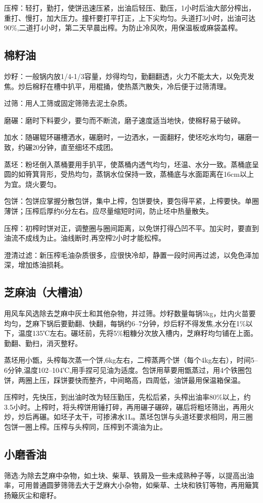 \documentclass{ctexbook}
\begin{document}
压榨：轻打，勤打，使饼迅速压紧，出油后轻压、勤压，1小时后油大部分榨出，重打、慢打，加大压力。撞杆要打平打正，上下尖均匀。头道打3小时，出油可达90\%,二道打4小时，第二天早晨出榨。为防止冷风吹，用保温板或麻袋盖榨。

\subsection{棉籽油}
炒籽：一般锅内放1/4-1/3容量，炒得均匀，勤翻翻透，火力不能太大，以免壳发焦。炒后棉籽在槽中扒平，用棍捅，使热蒸汽散失，冷后便于过筛清理。

过筛：用人工筛或固定筛筛去泥土杂质。

磨碾：磨时下料要少，要匀而不断流，磨子速度适当地快，使棉籽易于破碎。

加水：随碾辊环碾槽洒水，碾磨时，一边洒水，一面翻籽，使坯吃水均匀，碾磨一致，约碾20分钟，直至细坯不成团。

蒸坯：粉坯倒入蒸桶要用手扒平，使蒸桶内透气均匀，坯温、水分一致。蒸桶底呈圆的如筲箕背形，受热均匀，蒸锅水位保持一致，蒸桶底与水面距离在16cm以上为宜。烧火要匀。

包饼：包饼应掌握分散包饼，集中上榨，包饼要快，要包得平紧，上榨要快。单圈薄饼；压榨后厚约6分左右。应尽量缩短时间，防止坯中热量散失。

压榨：初榨时饼对正，调整圈与圈间距离，以免饼打得凸凹不平。加尖时，要直到油流不成线为止。油线断时,再空榨2小时才能松榨。

澄清过滤：新压榨毛油杂质很多，应很快冷却，静置一段时间再过滤，以免色泽加深，增加炼油损耗。
\subsection{芝麻油（大槽油）}
用风车风选除去芝麻中灰土和其他杂物，并过筛。炒籽数量每锅5kg，灶内火苗要均匀，芝麻下锅后要勤翻、快翻，每锅约6--7分钟，炒后籽不得发焦,水分在1\%以下，温度135℃左右。碾坯前，先将5\%粗糠分次放入槽内，芝麻籽均匀铺在上面。勤翻、勤扫，消灭整籽。

蒸坯用小甑，头榨每次蒸一个饼,6kg左右，二榨蒸两个饼（每个4kg左右），时间5--6分钟,温度102--104℃,用手捏可见油为适度。包饼用草要用甑蒸过，用4个铁圈包饼，两圈上压，踩饼要快而整齐，中间略高，四周低，油饼最用保温箱保温。

压榨时，先快压，到出油时改为轻压勤压，先松后紧，头榨出油率80\%以上，约3.5小时。上榨时，将头榨饼用锤打碎，再用碾子碾碎，碾后将粗坯筛出，再用火炒，炒后再碾。如坯子太干，可掺沸水1L。蒸坯包饼与头道坯要求相同，用三圈包饼一圈上榨。压榨与头榨同，压榨到不滴油为止。

\subsection{小磨香油}
筛选:为除去芝麻中杂物，如土块、柴草、铁屑及一些未成熟种子等，以提高出油率，可用普通圆萝筛筛去大于芝麻大小杂物，如柴草、土块和铁钉等物，再用簸箕扬簸灰尘和瘪籽。
\end{document}
